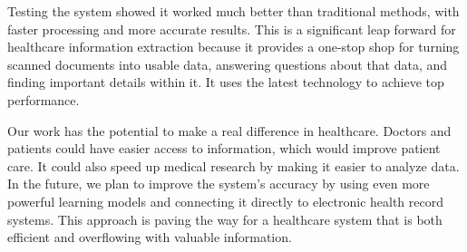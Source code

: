 \documentclass[conference]{IEEEtran}
\begin{document}
Testing the system showed it worked much better than traditional methods, with faster processing and more accurate results. This is a significant leap forward for healthcare information extraction because it provides a one-stop shop for turning scanned documents into usable data, answering questions about that data, and finding important details within it. It uses the latest technology to achieve top performance.

Our work has the potential to make a real difference in healthcare. Doctors and patients could have easier access to information, which would improve patient care. It could also speed up medical research by making it easier to analyze data. In the future, we plan to improve the system's accuracy by using even more powerful learning models and connecting it directly to electronic health record systems. This approach is paving the way for a healthcare system that is both efficient and overflowing with valuable information.

    
\end{document}
